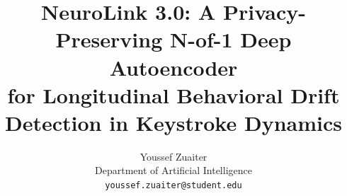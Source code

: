 \documentclass[10pt,twocolumn,letterpaper]{article}
\title{NeuroLink 3.0: A Privacy-Preserving N-of-1 Deep Autoencoder\\
for Longitudinal Behavioral Drift Detection in Keystroke Dynamics}
\author{Youssef Zuaiter\\
Department of Artificial Intelligence\\
{\tt\small youssef.zuaiter@student.edu}
}
\begin{document}
\maketitle








{
    \small
    
    
}
\end{document}
